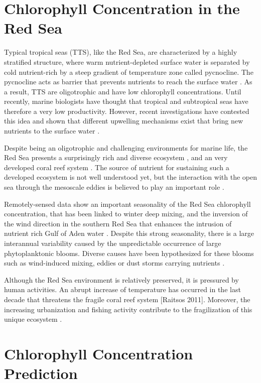\section{Chlorophyll Concentration in the Red Sea}

Typical tropical seas (TTS), like the Red Sea, are characterized by a highly stratified structure, where warm nutrient-depleted surface water is separated by cold nutrient-rich by a steep gradient of temperature zone called pycnocline. The pycnocline acts as barrier that prevents nutrients to reach the surface water \cite{Mann2006}. As a result, TTS are oligotrophic and have low chlorophyll concentrations. Until recently, marine biologists have thought that tropical and subtropical seas have therefore a very low productivity. However, recent investigations have contested this idea and shown that different upwelling mechanisms exist that bring new nutrients to the surface water \cite{Mann2006}.

Despite being an oligotrophic and challenging environments for marine life, the Red Sea presents a surprisingly rich and diverse ecosystem \cite{Raitsos2011}, and an very developed coral reef system \cite{Racault}. The source of nutrient for sustaining such a developed ecosystem is not well understood yet, but the interaction with the open sea through the mesoscale eddies is believed to play an important role \cite{Raitsos2013}.

Remotely-sensed data show an important seasonality of the Red Sea chlorophyll concentration, that has been linked to winter deep mixing, and the inversion of the wind direction in the southern Red Sea that enhances the intrusion of nutrient rich Gulf of Aden water \cite{Raitsos2013}. Despite this strong seasonality, there is a large interannual variability caused by the unpredictable occurrence of large phytoplanktonic blooms. Diverse causes have been hypothesized for these blooms such as wind-induced mixing, eddies or dust storms carrying nutrients \cite{Raitsos2013}.

Although the Red Sea environment is relatively preserved, it is pressured by human activities. An abrupt increase of temperature has occurred in the last decade that threatens the fragile coral reef system [Raitsos 2011]. Moreover, the increasing urbanization and fishing activity contribute to the fragilization of this unique ecosystem \cite{Acker2008}.

\section{Chlorophyll Concentration Prediction}

